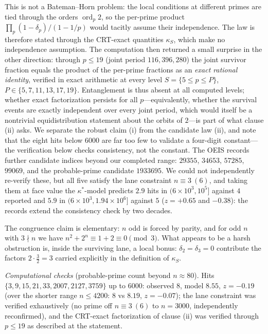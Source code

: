 \documentclass[11pt]{article}
\theoremstyle{definition}
\DeclareMathOperator{\ord}{ord}
\begin{document}
This is not a Bateman--Horn problem: the local conditions at different
primes are tied through the orders $\ord_p2$, so the per-prime
product $\prod_p(1-\delta_p)/(1-1/p)$ would tacitly assume their
independence.  The law is therefore stated through the CRT-exact
quantities $\kappa_S$, which make no independence assumption.  The
computation then returned a small
surprise in the other direction: through $p\le19$ (joint period
$116{,}396{,}280$) the joint survivor fraction equals the product of
the per-prime fractions as an \emph{exact rational identity},
verified in exact arithmetic at every level $S=\{5\le p\le P\}$,
$P\in\{5,7,11,13,17,19\}$.  Entanglement is thus
absent at all computed levels; whether exact factorization persists
for all $p$---equivalently, whether the survival events are exactly
independent over every joint period, which would itself be a nontrivial
equidistribution statement about the orbits of $2$---is part of what
clause (ii) asks.  We separate the robust claim (i) from the
candidate law (ii), and note that the eight hits below $6000$ are far
too few to validate a four-digit constant---the verification below
checks consistency, not the constant.  The OEIS records further candidate
indices beyond our completed
range:
$29355$, $34653$, $57285$, $99069$, and the probable-prime candidate
$1933695$.  We could not independently re-verify these, but all five satisfy
the lane constraint
$n\equiv3\ (6)$, and taking them at face value the $\kappa^{*}$-model
predicts $2.9$ hits in $(6\times10^3,10^5]$ against $4$ reported and
$5.9$ in $(6\times10^3,1.94\times10^6]$ against $5$ ($z=+0.65$ and
$-0.38$): the records extend the consistency check by two decades.

The congruence claim is elementary: $n$ odd is forced by parity, and for
odd $n$ with $3\nmid n$ we have $n^2+2^n\equiv1+2\equiv0\pmod3$.  What
appears to be a harsh obstruction is, inside the surviving lane, a local
bonus: $\delta_2=\delta_3=0$ contribute the factors $2\cdot\tfrac32=3$
carried explicitly in the definition of $\kappa_S$.

\emph{Computational checks} (probable-prime count beyond $n\approx80$).
Hits $\{3,9,15,21,33,2007,2127,3759\}$ up to $6000$:
observed $8$, model $8.55$, $z=-0.19$ (over the shorter range $n\le4200$:
$8$ vs $8.19$, $z=-0.07$); the lane constraint was verified
exhaustively (no prime off $n\equiv3\ (6)$ to $n=3000$, independently
reconfirmed), and the CRT-exact factorization of clause (ii) was
verified through $p\le19$ as described at the statement.
\end{document}
